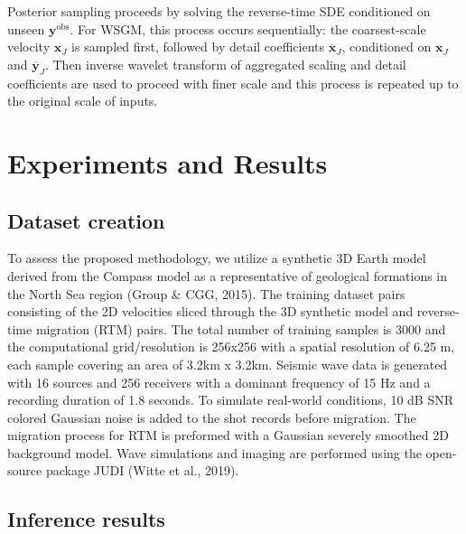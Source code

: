 \documentclass{IMAGE2025}
\begin{document}
Posterior sampling proceeds by solving the reverse-time SDE conditioned
on unseen \(\mathbf{y}^{\text{obs}}\). For WSGM, this process occurs
sequentially: the coarsest-scale velocity \(\mathbf{x}_J\) is sampled
first, followed by detail coefficients \(\overline{\mathbf{x}}_J\),
conditioned on \(\mathbf{x}_J\) and \(\overline{\mathbf{y}}_J\). Then
inverse wavelet transform of aggregated scaling and detail coefficients
are used to proceed with finer scale and this process is repeated up to
the original scale of inputs.

\section{Experiments and Results}\label{experiments-and-results}

\subsection{Dataset creation}\label{dataset-creation}

To assess the proposed methodology, we utilize a synthetic 3D Earth
model derived from the Compass model as a representative of geological
formations in the North Sea region (Group \& CGG, 2015). The training
dataset pairs consisting of the 2D velocities sliced through the 3D
synthetic model and reverse-time migration (RTM) pairs. The total number
of training samples is 3000 and the computational grid/resolution is
256x256 with a spatial resolution of 6.25 m, each sample covering an
area of 3.2km x 3.2km. Seismic wave data is generated with 16 sources
and 256 receivers with a dominant frequency of 15 Hz and a recording
duration of 1.8 seconds. To simulate real-world conditions, 10 dB SNR
colored Gaussian noise is added to the shot records before migration.
The migration process for RTM is preformed with a Gaussian severely
smoothed 2D background model. Wave simulations and imaging are performed
using the open-source package JUDI (Witte et al., 2019).

\subsection{Inference results}\label{inference-results}
\end{document}
